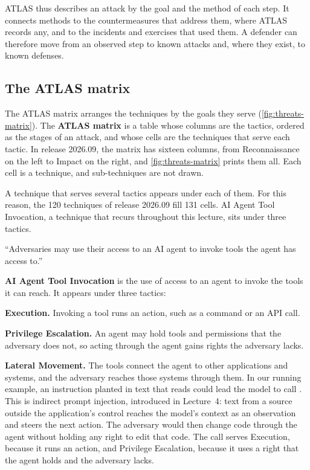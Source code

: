 ATLAS thus describes an attack by the goal and the method of each step. It connects methods to the
countermeasures that address them, where ATLAS records any, and to the incidents and exercises that
used them. A defender can therefore move from an observed step to known attacks and, where they
exist, to known defenses.

\subsection{The ATLAS matrix}
\label{sec:threats-matrix}

The ATLAS matrix arranges the techniques by the goals they serve (\cref{fig:threats-matrix}). The
\textbf{ATLAS matrix} is a table whose columns are the tactics, ordered as the stages of an attack,
and whose cells are the techniques that serve each tactic. In release 2026.09, the matrix has
sixteen columns, from Reconnaissance on the left to Impact on the right, and
\cref{fig:threats-matrix} prints them all. Each cell is a technique, and sub-techniques are not
drawn.

A technique that serves several tactics appears under each of them. For this reason, the 120
techniques of release 2026.09 fill 131 cells. AI Agent Tool Invocation, a technique that recurs
throughout this lecture, sits under three tactics.

\begin{definition}
\label{def:threats-invocation}
``Adversaries may use their access to an AI agent to invoke tools the agent has access to.''
\citep{mitre-atlas-2026}
\end{definition}

\textbf{AI Agent Tool Invocation} is the use of access to an agent to invoke the tools it can reach.
It appears under three tactics:
\bi
\item \textbf{Execution.} Invoking a tool runs an action, such as a command or an API call.
\item \textbf{Privilege Escalation.} An agent may hold tools and permissions that the adversary does
not, so acting through the agent gains rights the adversary lacks.
\item \textbf{Lateral Movement.} The tools connect the agent to other applications and systems, and
the adversary reaches those systems through them.
\ei
In our running example, an instruction planted in text that \msa{} reads could lead the model to
call . This is indirect prompt injection, introduced in Lecture~4: text from a source
outside the application's control reaches the model's context as an observation and steers the next
action. The adversary would then change code through the agent without holding any right to edit
that code. The call serves Execution,
because it runs an action, and Privilege Escalation, because it uses a right that the agent holds
and the adversary lacks.

